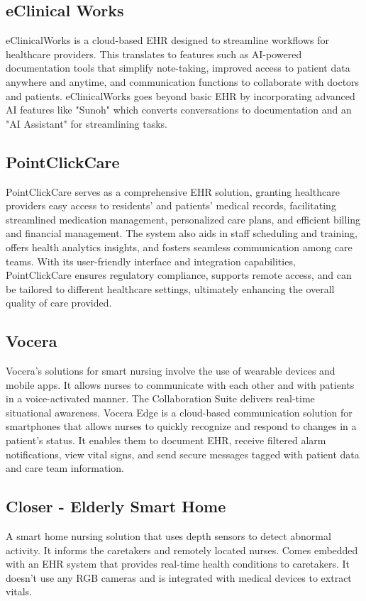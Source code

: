 \subsection{eClinical Works}
eClinicalWorks is a cloud-based EHR designed to streamline workflows for healthcare providers. This translates to features such as AI-powered documentation tools that simplify note-taking, improved access to patient data anywhere and anytime, and communication functions to collaborate with doctors and patients. eClinicalWorks goes beyond basic EHR by incorporating advanced AI features like "Sunoh" which converts conversations to documentation and an "AI Assistant" for streamlining tasks.
\subsection{PointClickCare}
PointClickCare serves as a comprehensive EHR solution, granting healthcare providers easy access to residents' and patients' medical records, facilitating streamlined medication management, personalized care plans, and efficient billing and financial management. The system also aids in staff scheduling and training, offers health analytics insights, and fosters seamless communication among care teams. With its user-friendly interface and integration capabilities, PointClickCare ensures regulatory compliance, supports remote access, and can be tailored to different healthcare settings, ultimately enhancing the overall quality of care provided.

\subsection{Vocera}
Vocera's solutions for smart nursing involve the use of wearable devices and mobile apps. It allows nurses to communicate with each other and with patients in a voice-activated manner. The Collaboration Suite delivers real-time situational awareness. Vocera Edge is a cloud-based communication solution for smartphones that allows nurses to quickly recognize and respond to changes in a patient's status. It enables them to document EHR, receive filtered alarm notifications, view vital signs, and send secure messages tagged with patient data and care team information.
\subsection{Closer - Elderly Smart Home}
A smart home nursing solution that uses depth sensors to detect abnormal activity. It informs the caretakers and remotely located nurses. Comes embedded with an EHR system that provides real-time health conditions to caretakers. It doesn't use any RGB cameras and is integrated with medical devices to extract vitals. 
